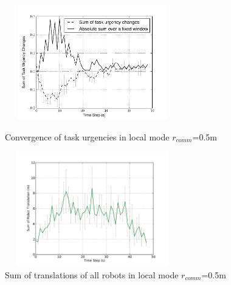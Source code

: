 \documentclass[letterpaper, 10 pt, times, conference]{ieeeconf} %
\begin{document}
\begin{figure}
\begin{minipage}[t]{0.5\linewidth}
\centering
\includegraphics[height=5cm,width=3in]
{images/local-500cm/Local50cm-TaskUrgencyConvergence}
\caption{\small Convergence of task urgencies in local mode $r_{comm}$=0.5m}
\label{fig:local50cm-convergence} %
\end{minipage}
\hspace{0.5cm}
\begin{minipage}[t]{0.5\linewidth}
\centering
\includegraphics[height=5cm,width=3in]
{images/local-500cm/DeltaTranslationStat}
\caption{\small Sum of translations of all robots in local mode $r_{comm}$=0.5m }
\label{fig:local50cm-tr} %
\end{minipage}
\end{figure}
\end{document}
